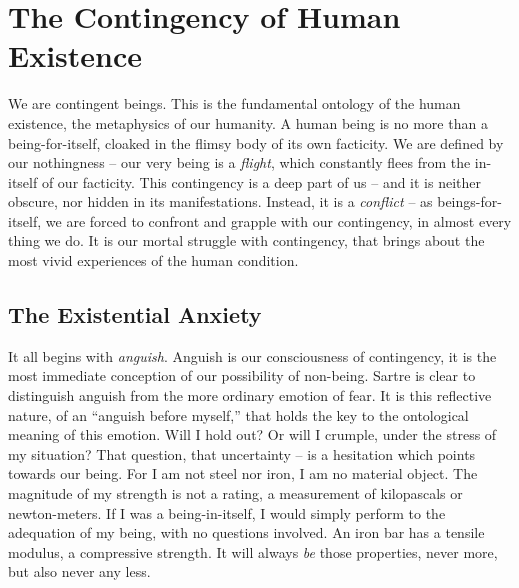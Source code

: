 \chapter{The Contingency of Human Existence}

We are contingent beings. This is the fundamental ontology of the human existence, the metaphysics of our humanity. A human being is no more than a being-for-itself, cloaked in the flimsy body of its own facticity. We are defined by our nothingness -- our very being is a \emph{flight}, which constantly flees from the in-itself of our facticity. This contingency is a deep part of us -- and it is neither obscure, nor hidden in its manifestations. Instead, it is a \emph{conflict} -- as beings-for-itself, we are forced to confront and grapple with our contingency, in almost every thing we do. It is our mortal struggle with contingency, that brings about the most vivid experiences of the human condition. 

\section{The Existential Anxiety}

It all begins with \emph{anguish}. Anguish is our consciousness of contingency, it is the most immediate conception of our possibility of non-being. Sartre is clear to distinguish anguish from the more ordinary emotion of fear.  It is this reflective nature, of an \enquote{anguish before myself,} that holds the key to the ontological meaning of this emotion.  
Will I hold out? Or will I crumple, under the stress of my situation?
That question, that uncertainty -- is a hesitation which points towards our being. For I am not steel nor iron, I am no material object.
The magnitude of my strength is not a rating, a measurement of kilopascals or newton-meters. If I was a being-in-itself, I would simply perform to the adequation of my being, with no questions involved. An iron bar has a tensile modulus, a compressive strength. It will always \emph{be} those properties, never more, but also never any less.

